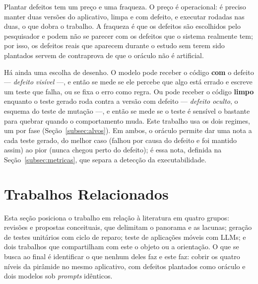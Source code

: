 \documentclass[12pt]{article}
\begin{document}
Plantar defeitos tem um preço e uma fraqueza. O preço é operacional: é
preciso manter duas versões do aplicativo, limpa e com defeito, e executar
rodadas nas duas, o que dobra o trabalho. A fraqueza é que os defeitos são
escolhidos pelo pesquisador e podem não se parecer com os defeitos que o
sistema realmente tem; por isso, os defeitos reais que aparecem durante o
estudo sem terem sido plantados servem de contraprova de que o oráculo não é
artificial.

Há ainda uma escolha de desenho. O modelo pode receber o código \textbf{com}
o defeito --- \emph{defeito visível} ---, e então se mede se ele percebe que
algo está errado e escreve um teste que falha, ou se fixa o erro como regra.
Ou pode receber o código \textbf{limpo} enquanto o teste gerado roda contra
a versão com defeito --- \emph{defeito oculto}, o esquema do teste de
mutação ---, e então se mede se o teste é sensível o bastante para quebrar
quando o comportamento muda. Este trabalho usa os dois regimes, um por fase
(Seção~\ref{subsec:alvos}). Em ambos, o oráculo permite dar uma nota a cada
teste gerado, do melhor caso (falhou por causa do defeito e foi mantido
assim) ao pior (nunca chegou perto do defeito); é essa nota, definida na
Seção~\ref{subsec:metricas}, que separa a detecção da executabilidade.

\section{Trabalhos Relacionados}
\label{sec:relacionados}

Esta seção posiciona o trabalho em relação à literatura em quatro grupos:
revisões e propostas conceituais, que delimitam o panorama e as lacunas;
geração de testes unitários com ciclo de reparo; teste de aplicações móveis
com LLMs; e dois trabalhos que compartilham com este o objeto ou a
orientação. O que se busca ao final é identificar o que nenhum deles faz e
este faz: cobrir os quatro níveis da pirâmide no mesmo aplicativo, com
defeitos plantados como oráculo e dois modelos sob \textit{prompts}
idênticos.
\end{document}
